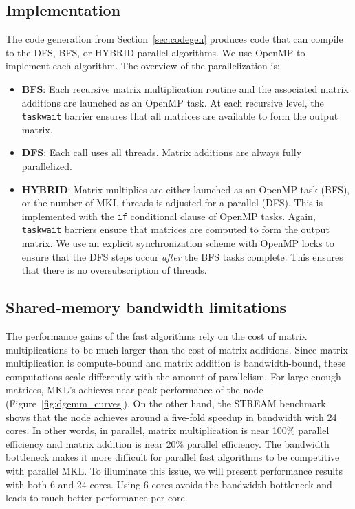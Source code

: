 \documentclass[preprint]{sigplanconf}
\begin{document}
\subsection{Implementation}
\label{sec:par_implementation}

The code generation from Section~\ref{sec:codegen} produces code that can compile to the DFS, BFS, or HYBRID parallel algorithms.
We use OpenMP to implement each algorithm.
The overview of the parallelization is:
\begin{itemize}
\item \textbf{BFS}: Each recursive matrix multiplication routine and the associated matrix additions are launched as an OpenMP task.
At each recursive level, the \texttt{taskwait} barrier ensures that all  matrices are available to form the output matrix.
\item \textbf{DFS}: Each  call uses all threads.
Matrix additions are always fully parallelized.
\item \textbf{HYBRID}:
Matrix multiplies are either launched as an OpenMP task (BFS), or the number of MKL threads is adjusted for a parallel  (DFS).
This is implemented with the \texttt{if} conditional clause of OpenMP tasks.
Again, \texttt{taskwait} barriers ensure that  matrices are computed to form the output matrix.
We use an explicit synchronization scheme with OpenMP locks to ensure that the DFS steps occur \emph{after} the BFS tasks complete.
This ensures that there is no oversubscription of threads.
\end{itemize}

\subsection{Shared-memory bandwidth limitations}
\label{sec:bandwidth}

The performance gains of the fast algorithms rely on the cost of matrix multiplications to be much larger than the cost of matrix additions.
Since matrix multiplication is compute-bound and matrix addition is bandwidth-bound, these computations scale differently with the amount of parallelism.
For large enough matrices, MKL's  achieves near-peak performance of the node (Figure~\ref{fig:dgemm_curves}).
On the other hand, the STREAM benchmark \cite{mccalpin1995survey} shows that the node achieves around a five-fold speedup in bandwidth with 24 cores.
In other words, in parallel, matrix multiplication is near 100\% parallel efficiency and matrix addition is near 20\% parallel efficiency.
The bandwidth bottleneck makes it more difficult for parallel fast algorithms to be competitive with parallel MKL.
To illuminate this issue, we will present performance results with both 6 and 24 cores.
Using 6 cores avoids the bandwidth bottleneck and leads to much better performance per core.
\end{document}
